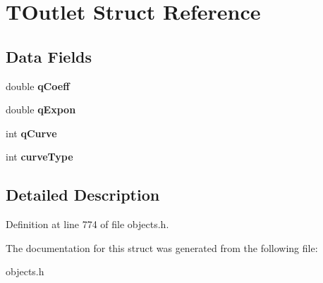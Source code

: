 \hypertarget{struct_t_outlet}{}\section{T\+Outlet Struct Reference}
\label{struct_t_outlet}
\subsection*{Data Fields}
\begin{DoxyCompactItemize}
\item 
\mbox{\label{struct_t_outlet_ae45a54cfa1c190064fe1ed8da4998205}} 
double {\bfseries q\+Coeff}
\item 
\mbox{\label{struct_t_outlet_a6bf3ff8bb6fce5a6c4824358cb198d55}} 
double {\bfseries q\+Expon}
\item 
\mbox{\label{struct_t_outlet_ae61eddec7082b195163719154f0f28d1}} 
int {\bfseries q\+Curve}
\item 
\mbox{\label{struct_t_outlet_a9d78f7a1a6619e61e8052c82da2b8a45}} 
int {\bfseries curve\+Type}
\end{DoxyCompactItemize}


\subsection{Detailed Description}


Definition at line 774 of file objects.\+h.



The documentation for this struct was generated from the following file\+:\begin{DoxyCompactItemize}
\item 
objects.\+h\end{DoxyCompactItemize}
